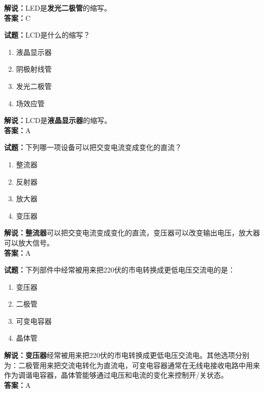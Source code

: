 \documentclass{ctexbook}
\begin{document}
\noindent\textbf{解说：}LED是\textbf{发光二极管}的缩写。\\\noindent\textbf{答案：}C

\vspace{\baselineskip}

\noindent\textbf{试题：}LCD是什么的缩写？

\begin{enumerate}[leftmargin=3em]
  \item 液晶显示器
  \item 阴极射线管
  \item 发光二极管
  \item 场效应管
\end{enumerate}

\noindent\textbf{解说：}LCD是\textbf{液晶显示器}的缩写。\\\noindent\textbf{答案：}A

\vspace{\baselineskip}

\noindent\textbf{试题：}下列哪一项设备可以把交变电流变成变化的直流？

\begin{enumerate}[leftmargin=3em]
  \item 整流器
  \item 反射器
  \item 放大器
  \item 变压器
\end{enumerate}

\noindent\textbf{解说：整流器}可以把交变电流变成变化的直流，变压器可以改变输出电压，放大器可以放大信号。\\\noindent\textbf{答案：}A

\vspace{\baselineskip}

\noindent\textbf{试题：}下列部件中经常被用来把220伏的市电转换成更低电压交流电的是：

\begin{enumerate}[leftmargin=3em]
  \item 变压器
  \item 二极管
  \item 可变电容器
  \item 晶体管
\end{enumerate}

\noindent\textbf{解说：变压器}经常被用来把220伏的市电转换成更低电压交流电。其他选项分别为：二极管用来把交流电转化为直流电，可变电容器通常在无线电接收电路中用来作为调谐电容器，晶体管能够通过电压和电流的变化来控制开/关状态。\\\noindent\textbf{答案：}A
\end{document}
